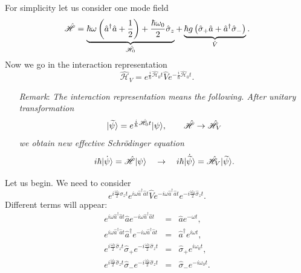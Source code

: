 For simplicity let us consider one mode field
\begin{equation}
	\hat{\mathscr{H}} = \underbrace{\hbar \omega \left( \hat{a}^{\dagger}\hat{a} + \frac{1}{2} \right) + \frac{\hbar \omega_0}{2} \hat{\sigma}_z}_{\hat{\mathscr{H}}_0} + \underbrace{\hbar g \left( \hat{\sigma}_+\hat{a} + \hat{a}^{\dagger} \hat{\sigma}_- \right)}_{\hat{V}}.
	\label{eq:hamillll}
\end{equation}
Now we go in the interaction representation
\begin{equation}
	\hat{\mathscr{H}}_V = e^{\frac{i}{\hbar} \hat{\mathscr{H}}_0 t} \hat{V} e^{-\frac{i}{\hbar} \hat{\mathscr{H}}_0 t}.
\end{equation}
\begin{enumerate}
	\item[\textit{Remark}:] \textit{The interaction representation means the following. 
	After unitary transformation }
	\begin{equation*}
	\lvert\widetilde{\psi}\rangle = e^{\frac{i}{\hbar} \hat{\mathscr{H}}_0 t} \lvert\psi\rangle, \qquad \hat{\mathscr{H}} \to \hat{\mathscr{H}}_V
	\end{equation*}
	\textit{we obtain new effective Schrödinger equation}
	\begin{equation*}
	i \hbar \dot{\lvert\psi\rangle} = \hat{\mathscr{H}} \lvert\psi\rangle \quad \to \quad i \hbar \dot{\lvert\widetilde{\psi}\rangle} = \hat{\mathscr{H}}_V \lvert\widetilde{\psi}\rangle.
	\end{equation*}   
\end{enumerate}
Let us begin. We need to consider
\begin{equation}
	e^{i \frac{\omega_0}{2} \hat{\sigma}_z t} e^{i \omega \hat{a}^{\dagger} \hat{a} t} \hat{V} e^{-i \omega \hat{a}^{\dagger} \hat{a} t} e^{-i \frac{\omega_0}{2} \hat{\sigma}_z t}.
\end{equation}
Different terms will appear:
\begin{eqnarray}
	e^{i \omega \hat{a}^{\dagger} \hat{a} t} \hat{a} e^{-i \omega \hat{a}^{\dagger} \hat{a} t} &=& \hat{a} e^{- \omega t}, \\
	e^{i \omega \hat{a}^{\dagger} \hat{a} t} \hat{a}^{\dagger} e^{-i \omega \hat{a}^{\dagger} \hat{a} t} &=& \hat{a}^{\dagger} e^{i \omega t}, \\
	e^{i \frac{\omega_0}{2} \hat{\sigma}_z t} \hat{\sigma}_+ e^{-i \frac{\omega_0}{2} \hat{\sigma}_z t} &=& \hat{\sigma}_+ e^{i \omega_0 t}, \\
	e^{i \frac{\omega_0}{2} \hat{\sigma}_z t} \hat{\sigma}_- e^{-i \frac{\omega_0}{2} \hat{\sigma}_z t} &=& \hat{\sigma}_- e^{-i \omega_0 t}.
\end{eqnarray}
